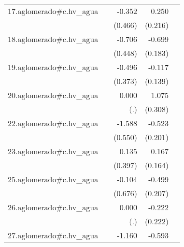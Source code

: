 {\begin{longtable}{l*{4}{D{.}{.}{-1}}}
\addlinespace
17.aglomerado#c.hv\_agua&                     &      -0.352         &       0.250         &                     \\
            &                     &     (0.466)         &     (0.216)         &                     \\
\addlinespace
18.aglomerado#c.hv\_agua&                     &      -0.706         &      -0.699\sym{***}&                     \\
            &                     &     (0.448)         &     (0.183)         &                     \\
\addlinespace
19.aglomerado#c.hv\_agua&                     &      -0.496         &      -0.117         &                     \\
            &                     &     (0.373)         &     (0.139)         &                     \\
\addlinespace
20.aglomerado#c.hv\_agua&                     &       0.000         &       1.075\sym{***}&                     \\
            &                     &         (.)         &     (0.308)         &                     \\
\addlinespace
22.aglomerado#c.hv\_agua&                     &      -1.588\sym{**} &      -0.523\sym{**} &                     \\
            &                     &     (0.550)         &     (0.201)         &                     \\
\addlinespace
23.aglomerado#c.hv\_agua&                     &       0.135         &       0.167         &                     \\
            &                     &     (0.397)         &     (0.164)         &                     \\
\addlinespace
25.aglomerado#c.hv\_agua&                     &      -0.104         &      -0.499\sym{*}  &                     \\
            &                     &     (0.676)         &     (0.207)         &                     \\
\addlinespace
26.aglomerado#c.hv\_agua&                     &       0.000         &      -0.222         &                     \\
            &                     &         (.)         &     (0.222)         &                     \\
\addlinespace
27.aglomerado#c.hv\_agua&                     &      -1.160\sym{*}  &      -0.593\sym{**} &                     \\

\end{longtable}}
